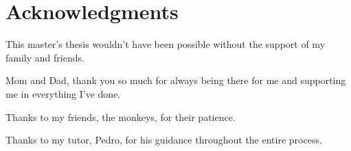 \chapter*{Acknowledgments}

This master's thesis wouldn't have been possible without the support of my family and friends.

Mom and Dad, thank you so much for always being there for me and supporting me in everything I've done.

Thanks to my friends, the monkeys, for their patience.

Thanks to my tutor, Pedro, for his guidance throughout the entire process.